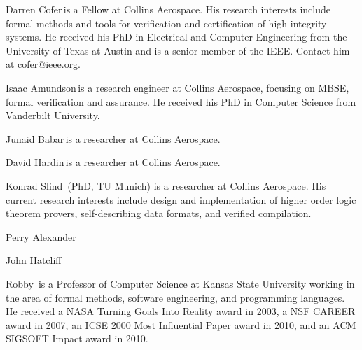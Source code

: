 \begin{IEEEbiography}{Darren Cofer}{\,}is a Fellow at Collins Aerospace. His research interests include formal methods and tools for verification and certification of high-integrity systems. He received his PhD in Electrical and Computer Engineering from the University of Texas at Austin and is a senior member of the IEEE. Contact him at cofer@ieee.org.
\end{IEEEbiography}

\begin{IEEEbiography}{Isaac Amundson}{\,}is a research engineer at Collins Aerospace, focusing on MBSE, formal verification and assurance.  He received his PhD in Computer Science from Vanderbilt University.
\end{IEEEbiography}

\begin{IEEEbiography}{Junaid Babar}{\,}is a researcher at Collins Aerospace.
\end{IEEEbiography}

\begin{IEEEbiography}{David Hardin}{\,}is a researcher at Collins Aerospace.
\end{IEEEbiography}

\begin{IEEEbiography}{Konrad Slind}{\,} (PhD, TU Munich) is a researcher at Collins Aerospace.
  His current research interests include design and implementation of
  higher order logic theorem provers, self-describing data formats,
  and verified compilation.
\end{IEEEbiography}

\begin{IEEEbiography}{Perry Alexander}{\,}
\end{IEEEbiography}

\begin{IEEEbiography}{John Hatcliff}{\,}
\end{IEEEbiography}

\begin{IEEEbiography}{Robby}{\,}
is a Professor of Computer Science at Kansas State University working
in the area of formal methods, software engineering, and programming
languages.
He received a NASA Turning Goals Into Reality award in 2003,
a NSF CAREER award in 2007, an ICSE 2000 Most Influential Paper award in 2010,
and an ACM SIGSOFT Impact award in 2010.
\end{IEEEbiography}

